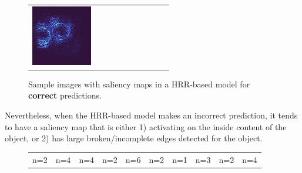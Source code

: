 \documentclass[letterpaper]{article} %
\begin{document}
\begin{figure}[!htbp]
\begin{tabular}{cccccccccc}
\multicolumn{1}{c}{\includegraphics[width=0.07\columnwidth]{figures/appendix/hrr/true/95_slc.jpg}} \hspace{-11pt}
\end{tabular}
\caption{Sample images with saliency maps in a HRR-based model for \textbf{correct} predictions.}
\label{fig:hrr_true}
\end{figure}

Nevertheless, when the HRR-based model makes an incorrect prediction, it tends to have a saliency map that is either 1) activating on the inside content of the object, or 2) has large broken/incomplete edges detected for the object.

\begin{figure}[!htbp]
\centering
\footnotesize
\begin{tabular}{cccccccccc}
\multicolumn{1}{c}{n=2} \hspace{-11pt} &
\multicolumn{1}{c}{n=4} \hspace{-11pt} &
\multicolumn{1}{c}{n=4} \hspace{-11pt} &
\multicolumn{1}{c}{n=2} \hspace{-11pt} &
\multicolumn{1}{c}{n=6} \hspace{-11pt} &
\multicolumn{1}{c}{n=2} \hspace{-11pt} &
\multicolumn{1}{c}{n=1} \hspace{-11pt} &
\multicolumn{1}{c}{n=3} \hspace{-11pt} &
\multicolumn{1}{c}{n=2} \hspace{-11pt} &
\multicolumn{1}{c}{n=4} \\


\end{tabular}
\end{figure}
\end{document}
